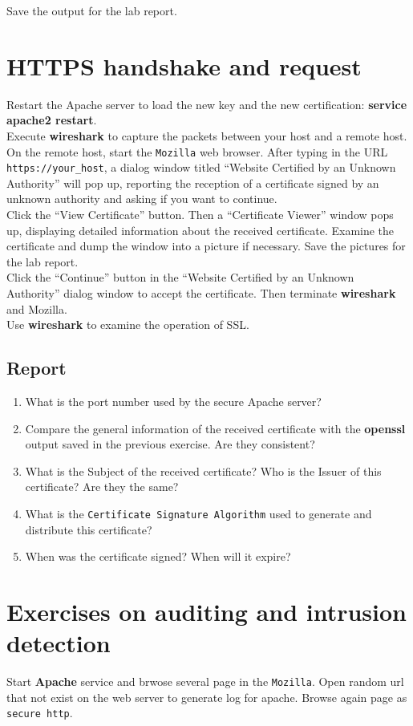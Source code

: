 \documentclass[10pt,a4paper]{article}
\numberwithin{equation}{section}
\numberwithin{figure}{section}
\numberwithin{table}{section}
\begin{document}
	Save the output for the lab report.

\section{HTTPS handshake and request}
	Restart the Apache server to load the new key and the new certification: \textbf{service apache2 restart}.\\
	Execute \textbf{wireshark} to capture the packets between your host and a remote host.\\
	On the remote host, start the \texttt{Mozilla} web browser. After typing in the URL \texttt{https://your\_host}, a dialog window titled “Website Certified by an Unknown Authority” will pop up, reporting the reception of a certificate signed by an unknown authority and asking if you want to continue.\\
	Click the “View Certificate” button. Then a “Certificate Viewer” window pops up, displaying detailed information about the received certificate. Examine the certificate and dump the window into a picture if necessary. Save the pictures for the lab report.\\
	Click the “Continue” button in the “Website Certified by an Unknown Authority” dialog window to accept the certificate. Then terminate \textbf{wireshark} and Mozilla.\\
	Use \textbf{wireshark} to examine the operation of SSL.
	
	
	\subsection*{Report}
	\begin{enumerate}
		\setlength{\itemindent}{0pt}
		\item What is the port number used by the secure Apache server?
		\item Compare the general information of the received certificate with the \textbf{openssl} output saved in the previous exercise. Are they consistent?
		\item What is the Subject of the received certificate? Who is the Issuer of this certificate? Are they the same?
		\item What is the \texttt{Certificate Signature Algorithm} used to generate and distribute this certificate?
		\item When was the certificate signed? When will it expire?
	\end{enumerate}

\section*{Exercises on auditing and intrusion detection}
	Start \textbf{Apache} service and brwose several page in the \texttt{Mozilla}. Open random url that not exist on the web server to generate log for apache. Browse again page as \texttt{secure http}.
\end{document}
